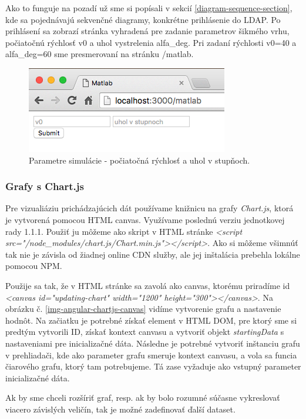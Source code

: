 Ako to funguje na pozadí už sme si popísali v sekcií \ref{diagram-sequence-section}, kde sa pojednávajú sekvenčné diagramy, konkrétne prihlásenie do LDAP.
Po prihlásení sa zobrazí stránka vyhradená pre zadanie parametrov šikmého vrhu, počiatočnú rýchlosť v0 a uhol vystrelenia alfa\_deg. Pri zadaní rýchlosti v0=40 a alfa\_deg=60 sme presmerovaní na stránku /matlab.

\begin{figure}[H]
  \centering
  \includegraphics[scale=0.7]{img/code/angular-simulation-param.png}
  \caption{Parametre simulácie - počiatočná rýchlosť a uhol v stupňoch.}
  \label{img-angular-params}
\end{figure}


\subsubsection{Grafy s Chart.js}
Pre vizualiáziu prichádzajúcich dát používame knižnicu na grafy \textit{Chart.js}, ktorá je vytvorená pomocou HTML canvas. Využívame poslednú verziu jednotkovej rady 1.1.1. Použiť ju môžeme ako skript v HTML stránke \textit{<script src="/node\_modules/chart.js/Chart.min.js"></script>}. Ako si môžeme všimnúť tak nie je závisla od žiadnej online CDN služby, ale jej inštalácia prebehla lokálne pomocou NPM.

Použije sa tak, že v HTML stránke sa zavolá ako canvas, ktorému priradíme id \textit{<canvas id="updating-chart" width="1200" height="300"></canvas>}. Na obrázku č. \ref{img-angular-chartjs-canvas} vidíme vytvorenie grafu a nastavenie hodnôt. Na začiatku je potrebné získať element v HTML DOM, pre ktorý sme si predtým vytvorili ID, získať kontext canvasu a vytvoriť objekt \textit{startingData} s nastaveniami pre inicializačné dáta. 
Následne je potrebné vytvoriť inštanciu grafu v prehliadači, kde ako parameter grafu smeruje kontext canvasu, a vola sa funcia čiarového grafu, ktorý tam potrebujeme. Tá zase vyžaduje ako vstupný parameter inicializačné dáta.

Ak by sme chceli rozšíriť graf, resp. ak by bolo rozumné súčasne vykreslovať viacero závislých veličín, tak je možné zadefinovať ďalší dataset.

